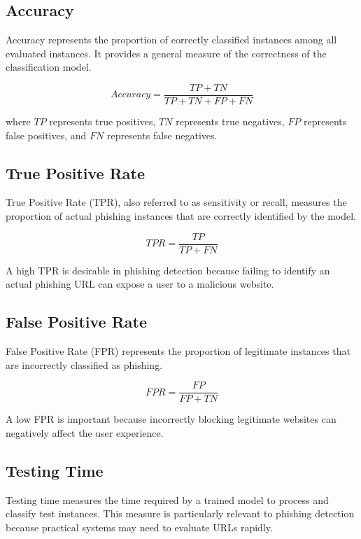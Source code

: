 \documentclass[12pt,a4paper]{report}
\begin{document}
\subsection{Accuracy}

Accuracy represents the proportion of correctly classified instances
among all evaluated instances. It provides a general measure of the
correctness of the classification model.

\begin{equation}
Accuracy =
\frac{TP + TN}{TP + TN + FP + FN}
\end{equation}

where $TP$ represents true positives, $TN$ represents true
negatives, $FP$ represents false positives, and $FN$ represents
false negatives.

\subsection{True Positive Rate}

True Positive Rate (TPR), also referred to as sensitivity or recall,
measures the proportion of actual phishing instances that are
correctly identified by the model.

\begin{equation}
TPR =
\frac{TP}{TP + FN}
\end{equation}

A high TPR is desirable in phishing detection because failing to
identify an actual phishing URL can expose a user to a malicious
website.

\subsection{False Positive Rate}

False Positive Rate (FPR) represents the proportion of legitimate
instances that are incorrectly classified as phishing.

\begin{equation}
FPR =
\frac{FP}{FP + TN}
\end{equation}

A low FPR is important because incorrectly blocking legitimate
websites can negatively affect the user experience.

\subsection{Testing Time}

Testing time measures the time required by a trained model to
process and classify test instances. This measure is particularly
relevant to phishing detection because practical systems may need to
evaluate URLs rapidly.
\end{document}
